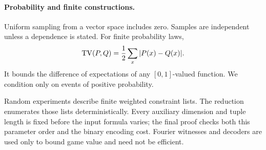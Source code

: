 \paragraph{Probability and finite constructions.}
Uniform sampling from a vector space includes zero. Samples are
independent unless a dependence is stated. For finite probability laws,
\[
 \operatorname{TV}(P,Q)=\frac12\sum_x|P(x)-Q(x)|.
\]
It bounds the difference of expectations of any \([0,1]\)-valued
function. We condition only on events of positive probability.

Random experiments describe finite weighted constraint lists.
The reduction enumerates those lists deterministically. Every auxiliary
dimension and tuple length is fixed before the input formula varies;
the final proof checks both this parameter order and the binary
encoding cost. Fourier witnesses and decoders are used only to bound
game value and need not be efficient.
